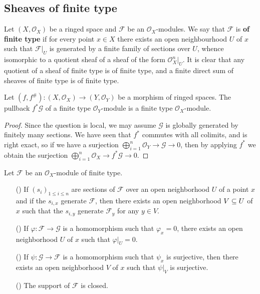 \subsection{Sheaves of finite type}
Let $(X,\mathscr{O}_X)$ be a ringed space and $\mathscr{F}$ be an $\mathscr{O}_X$-modules. We say that $\mathscr{F}$ is \textbf{of finite type} if for every point $x\in X$ there exists an open neighbourhood $U$ of $x$ such that $\mathscr{F}|_U$ is generated by a finite family of sections over $U$, whence isomorphic to a quotient sheaf of a sheaf of the form $\mathscr{O}_X^n|_U$. It is clear that any quotient of a sheaf of finite type is of finite type, and a finite direct sum of sheaves of finite type is of finite type. 
\begin{proposition}\label{sheaf of module ft inverse image is ft}
Let $(f,f^{\#}):(X,\mathscr{O}_X)\to(Y,\mathscr{O}_Y)$ be a morphism of ringed spaces. The pullback $f^*\mathscr{G}$ of a finite type $\mathscr{O}_Y$-module is a finite type $\mathscr{O}_X$-module.
\end{proposition}
\begin{proof}
Since the question is local, we may assume $\mathscr{G}$ is globally generated by finitely many sections. We have seen that $f^*$ commutes with all colimits, and is right exact, so if we have a surjection $\bigoplus_{i=1}^{n}\mathscr{O}_Y\to\mathscr{G}\to 0$, then by applying $f^*$ we obtain the surjection $\bigoplus_{i=1}^{n}\mathscr{O}_X\to f^*\mathscr{G}\to 0$.
\end{proof}
\begin{proposition}\label{sheaf of module ft local prop}
Let $\mathscr{F}$ be an $\mathscr{O}_X$-module of finite type.
\begin{itemize}
\item[(\rmnum{1})] If $(s_i)_{1\leq i\leq n}$ are sections of $\mathscr{F}$ over an open neighborhood $U$ of a point $x$ and if the $s_{i,x}$ generate $\mathscr{F}$, then there exists an open neighborhood $V\subseteq U$ of $x$ such that the $s_{i,y}$ generate $\mathscr{F}_y$ for any $y\in V$.
\item[(\rmnum{2})] If $\varphi:\mathscr{F}\to\mathscr{G}$ is a homomorphism such that $\varphi_x=0$, there exists an open neighborhood $U$ of $x$ such that $\varphi|_U=0$.
\item[(\rmnum{3})] If $\psi:\mathscr{G}\to\mathscr{F}$ is a homomorphism such that $\psi_x$ is surjective, then there exists an open neighborhood $V$ of $x$ such that $\psi|_V$ is surjective.
\item[(\rmnum{4})] The support of $\mathscr{F}$ is closed. 
\end{itemize}
\end{proposition}
